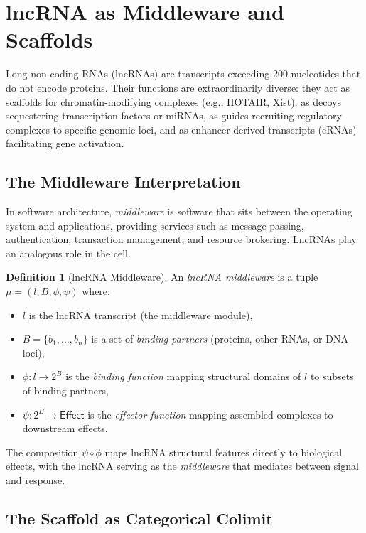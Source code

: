 \documentclass[12pt,a4paper]{article}
\theoremstyle{definition}
\newtheorem{definition}[theorem]{Definition}
\begin{document}
\section{lncRNA as Middleware and Scaffolds}\label{sec:lncrna}

Long non-coding RNAs (lncRNAs) are transcripts exceeding 200 nucleotides
that do not encode proteins.  Their functions are extraordinarily
diverse: they act as scaffolds for chromatin-modifying complexes (e.g.,
HOTAIR, Xist), as decoys sequestering transcription factors or miRNAs,
as guides recruiting regulatory complexes to specific genomic loci, and
as enhancer-derived transcripts (eRNAs) facilitating gene activation.

\subsection{The Middleware Interpretation}

In software architecture, \emph{middleware} is software that sits between
the operating system and applications, providing services such as
message passing, authentication, transaction management, and resource
brokering.  LncRNAs play an analogous role in the cell.

\begin{definition}[lncRNA Middleware]\label{def:lncrna-middleware}
An \emph{lncRNA middleware} is a tuple $\mu = (l, B, \phi, \psi)$ where:
\begin{itemize}
  \item $l$ is the lncRNA transcript (the middleware module),
  \item $B = \{b_1, \ldots, b_n\}$ is a set of \emph{binding partners}
    (proteins, other RNAs, or DNA loci),
  \item $\phi : l \to 2^B$ is the \emph{binding function} mapping
    structural domains of $l$ to subsets of binding partners,
  \item $\psi : 2^B \to \mathsf{Effect}$ is the \emph{effector function}
    mapping assembled complexes to downstream effects.
\end{itemize}
\end{definition}

The composition $\psi \circ \phi$ maps lncRNA structural features
directly to biological effects, with the lncRNA serving as the
\emph{middleware} that mediates between signal and response.

\subsection{The Scaffold as Categorical Colimit}
\end{document}
